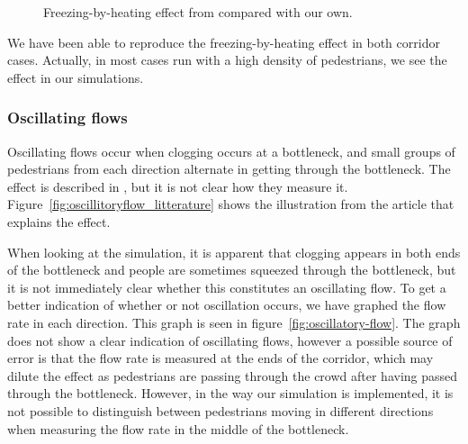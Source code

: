 \begin{figure}[h]
    \centering
    \caption[Freezing-by-heating effect from \cite{oscil} compared with our 
    own.]{Freezing-by-heating effect from \cite{oscil} compared with our own.}
    \label{fig:freezing_by_heating_litterature}
\end{figure}

We have been able to reproduce the freezing-by-heating effect in both corridor 
cases. Actually, in most cases run with a high density of pedestrians, we see 
the effect in our simulations.  

\subsubsection{Oscillating flows}
Oscillating flows occur when clogging occurs at a bottleneck, and small groups 
of pedestrians from each direction alternate in getting through the 
bottleneck. The effect is described in \cite{oscil}, but it is not clear how 
they measure it. Figure~\ref{fig:oscillitoryflow_litterature} shows the 
illustration from the article that explains the effect.

When looking at the simulation, it is apparent that clogging appears in both 
ends of the bottleneck and people are sometimes squeezed through the 
bottleneck, but it is not immediately clear whether this constitutes an 
oscillating flow.  To get a better indication of whether or not oscillation 
occurs, we have graphed the flow rate in each direction. This graph is seen in 
figure~\ref{fig:oscillatory-flow}. The graph does not show a clear indication 
of oscillating flows, however a possible source of error is that the flow rate 
is measured at the ends of the corridor, which may dilute the effect as 
pedestrians are passing through the crowd after having passed through the 
bottleneck. However, in the way our simulation is implemented, it is not 
possible to distinguish between pedestrians moving in different directions 
when measuring the flow rate in the middle of the bottleneck.

